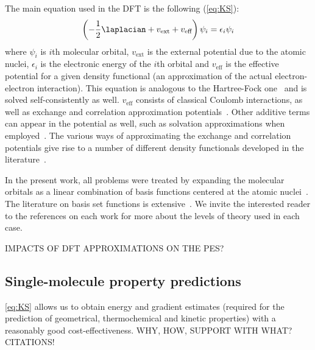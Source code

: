 The main equation used in the DFT is the following (\cref{eq:KS}):
%
\begin{equation}
	\left(-\frac{1}{2} \laplacian
	+ v_\text{ext}
	+ v_\text{eff}
	\right) \psi_i
	= \epsilon_i \psi_i
	\label{eq:KS}
\end{equation}
%
where $\psi_i$ is $i$th molecular orbital, $v_\text{ext}$ is the external
potential due to the atomic nuclei, $\epsilon_i$ is the electronic energy
of the $i$th orbital and $v_\text{eff}$ is the effective potential for a given
density functional (an approximation of the actual electron-electron
interaction).
This equation is analogous to the Hartree-Fock one~\cite{Szabo_1996}
and is solved self-consistently as well.
$v_\text{eff}$ consists of classical Coulomb interactions, as well as exchange
and correlation approximation
potentials~\cite{Perdew_2014,Kryachko_2014,Yu_2016}.
Other additive terms can appear in the potential as well, such as solvation
approximations when employed~\cite{Marenich_2009,Marenich_2012}.
The various ways of approximating the exchange and correlation potentials give
rise to a number of different density functionals developed in the
literature~\cite{Chai_2008a,Chai_2008b,Goerigk_2011,Arago_2011,Salzner_2011,Burns_2011,Minenkov_2012,DFT2016_poll}.

In the present work, all problems were treated by expanding the molecular
orbitals as a linear combination of basis functions centered at the atomic
nuclei~\cite{Szabo_1996,Helgaker_1997,Jensen_2012,Hill_2012}.
The literature on basis set functions is extensive~\cite{Ditchfield_1971,Hehre_1972,Hariharan_1973,Hariharan_1974,Gordon_1980,Francl_1982,Clark_1983,Frisch_1984,Binning_1990,Blaudeau_1997,Rassolov_1998,Rassolov_2001}.
We invite the interested reader to the references on each work for more about
the levels of theory used in each case.

IMPACTS OF DFT APPROXIMATIONS ON THE PES?\@


\subsection{Single-molecule property predictions}\label{sec:optimizations}

\cref{eq:KS} allows us to obtain energy and gradient estimates (required for
the prediction of geometrical, thermochemical and kinetic properties) with a
reasonably good cost-effectiveness.
WHY, HOW, SUPPORT WITH WHAT?\@ CITATIONS!\@


